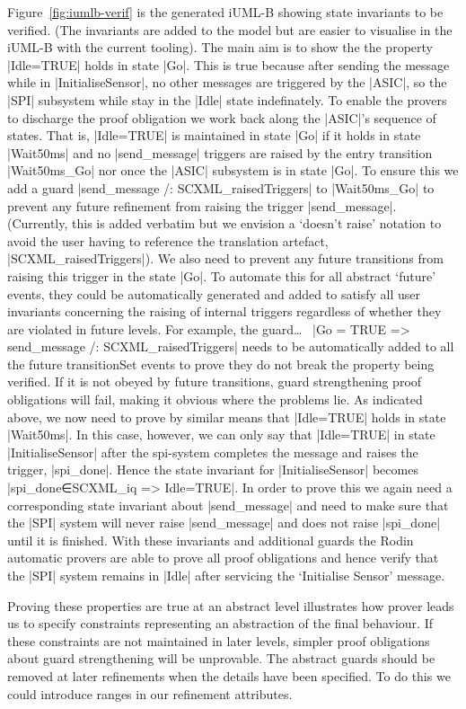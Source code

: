 Figure~\ref{fig:iumlb-verif} is the generated iUML-B showing state invariants to be verified. (The invariants are added to the \SCXML model but are easier to visualise in the iUML-B with the current tooling).
The main aim is to show the the property |Idle=TRUE| holds in state |Go|. 
This is true because after sending the message while in |InitialiseSensor|, no other messages are triggered by the |ASIC|, so the |SPI| subsystem while stay in the |Idle| state indefinately. 
To enable the provers to discharge the proof obligation we work back along the |ASIC|'s sequence of states. 
That is, |Idle=TRUE| is maintained in state |Go| if it holds in state |Wait50ms| and no |send_message| triggers are raised by the entry transition |Wait50ms_Go| nor once the |ASIC| subsystem is in state |Go|. 
To ensure this we add a guard |send_message /: SCXML_raisedTriggers| to |Wait50ms_Go| to prevent any future refinement from raising the trigger |send_message|.
(Currently, this is added verbatim but we envision a `doesn't raise' notation to avoid the user having to reference the translation artefact, |SCXML_raisedTriggers|).
We also need to prevent any future transitions from raising this trigger in the state |Go|.
To automate this for all abstract `future' events, they could be automatically generated and added to satisfy all user invariants concerning the raising of internal triggers regardless of whether they are violated in future levels. For example, the guard… 
     |Go = TRUE => send_message /: SCXML_raisedTriggers|
needs to be automatically added to all the future transitionSet events to prove they do not break the property being verified. If it is not obeyed by future transitions, guard strengthening proof obligations will fail, making it obvious where the problems lie.
As indicated above, we now need to prove by similar means that |Idle=TRUE| holds in state |Wait50ms|. In this case, however, we can only say that |Idle=TRUE| in state |InitialiseSensor| after the spi-system completes the message and raises the trigger, |spi_done|. Hence the state invariant for |InitialiseSensor| becomes |spi_done∈SCXML_iq => Idle=TRUE|. In order to prove this we again need a corresponding state invariant about |send_message| and need to make sure that the |SPI| system will never raise |send_message| and does not raise |spi_done| until it is finished. With these invariants and additional guards the Rodin automatic provers are able to prove all proof obligations and hence verify that the |SPI| system remains in |Idle| after servicing the `Initialise Sensor' message.

Proving these properties are true at an abstract level illustrates how prover leads us to specify constraints representing an abstraction of the final behaviour. If these constraints are not maintained in later levels, simpler proof obligations about guard strengthening will be unprovable. The abstract guards should be removed at later refinements when the details have been specified. To do this we could introduce ranges in our refinement attributes.

